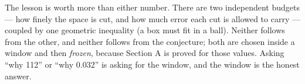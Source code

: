\documentclass[11pt]{article}
\begin{document}
\medskip
\noindent
The lesson is worth more than either number. There are two independent budgets --- how finely the
space is cut, and how much error each cut is allowed to carry --- coupled by one geometric inequality
(a box must fit in a ball). Neither follows from the other, and neither follows from the conjecture;
both are chosen inside a window and then \emph{frozen}, because Section A is proved for those values.
Asking ``why 112'' or ``why 0.032'' is asking for the window, and the window is the honest answer.
\end{document}
